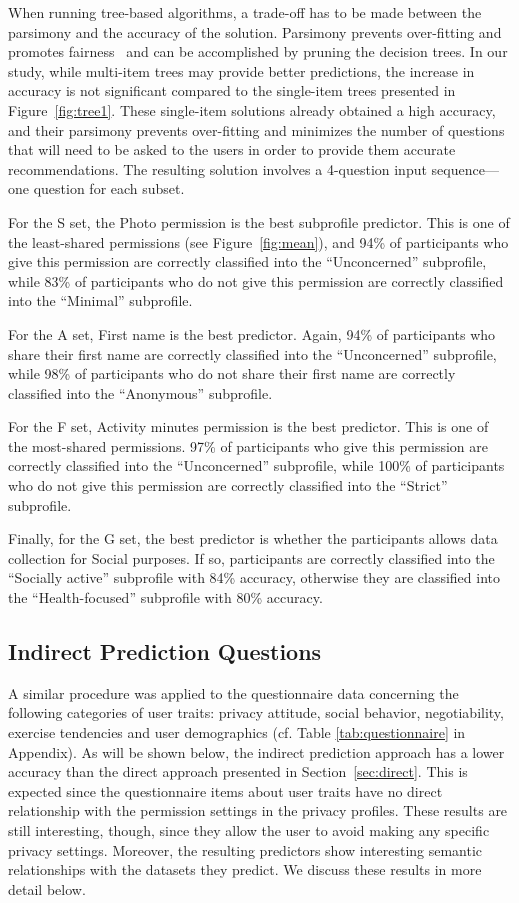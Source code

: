 When running tree-based algorithms, a trade-off has to be made between the parsimony and the accuracy of the solution. Parsimony prevents over-fitting and promotes fairness~\cite{bahirat2018data} and can be accomplished by pruning the decision trees. In our study, while multi-item trees may provide better predictions, the increase in accuracy is not significant compared to the single-item trees presented in Figure~\ref{fig:tree1}. These single-item solutions already obtained a high accuracy, and their parsimony prevents over-fitting and minimizes the number of questions that will need to be asked to the users in order to provide them accurate recommendations. The resulting solution involves a 4-question input sequence---one question for each subset. 

For the S set, the Photo permission is the best subprofile predictor. This is one of the least-shared permissions (see Figure~\ref{fig:mean}), and 94\% of participants who give this permission are correctly classified into the ``Unconcerned'' subprofile, while 83\% of participants who do not give this permission are correctly classified into the ``Minimal'' subprofile. 

For the A set, First name is the best predictor. Again, 94\% of participants who share their first name are correctly classified into the ``Unconcerned'' subprofile, while 98\% of participants who do not share their first name are correctly classified into the ``Anonymous'' subprofile.

For the F set, Activity minutes permission is the best predictor. This is one of the most-shared permissions. 97\% of participants who give this permission are correctly classified into the ``Unconcerned'' subprofile, while 100\% of participants who do not give this permission are correctly classified into the ``Strict'' subprofile.

Finally, for the G set, the best predictor is whether the participants allows data collection for Social purposes. If so, participants are correctly classified into the ``Socially active'' subprofile with 84\% accuracy, otherwise they are classified into the ``Health-focused'' subprofile with 80\% accuracy.


\subsection{Indirect Prediction Questions}

A similar procedure was applied to the questionnaire data concerning the following categories of user traits: privacy attitude, social behavior, negotiability, exercise tendencies and  user demographics (cf. Table \ref{tab:questionnaire} in Appendix).
As will be shown below, the indirect prediction approach has a lower accuracy than the direct approach presented in Section~\ref{sec:direct}. This is expected since the questionnaire items about user traits have no direct relationship with the permission settings in the privacy profiles.
These results are still interesting, though, since they allow the user to avoid making any specific privacy settings. Moreover, the resulting predictors show interesting semantic relationships with the datasets they predict. We discuss these results in more detail below.


